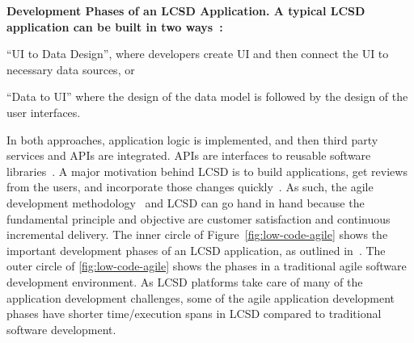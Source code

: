 \nd\bf{Development Phases of an  LCSD Application.} A typical  LCSD application can be built in two ways~\cite{sahay2020supporting}: \begin{inparaenum}
\item ``UI to Data Design'', where developers create UI and then connect the UI to necessary data sources, or \item ``Data to UI'' where the design of the data model is followed by the design of the user interfaces. \end{inparaenum} In both approaches, application logic is implemented, and then third party services and APIs are integrated. APIs are interfaces to reusable software libraries~\cite{Robillard-APIProperty-IEEETSE2012}.  
A major motivation behind  LCSD is to build applications, get reviews from the users, and incorporate those changes quickly~\cite{waszkowski2019low-automating}. As such, the agile development methodology~\cite{beck2001manifesto} and  LCSD can go hand in hand because the fundamental principle and objective are customer satisfaction and continuous incremental delivery. The inner circle of Figure~\ref{fig:low-code-agile} shows the important development phases of an  LCSD application, as outlined in~\cite{sahay2020supporting}. The outer circle of \fig\ref{fig:low-code-agile} shows the phases in a traditional agile software development environment. As  LCSD platforms take care of many of the application development challenges, some of the agile application development phases have shorter time/execution spans in  LCSD compared to traditional software development. 








 

